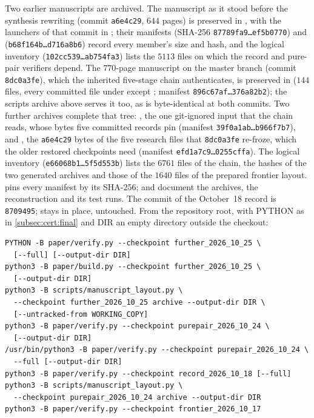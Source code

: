 Two earlier manuscripts are archived. The manuscript as it stood before the synthesis
rewriting (commit \texttt{a6e4c29}, $644$ pages) is preserved in
, with the launchers of that
commit in ; their manifests
 (SHA-256
\texttt{87789fa9\ldots ef5b0770}) and
(\texttt{b68f164b\ldots d716a8b6}) record every member's size and hash, and the
logical inventory 
(\texttt{102cc539\ldots ab754fa3}) lists the $5113$ files on which the record and
pure-pair verifiers depend. The $770$-page manuscript on the master branch (commit
\texttt{8dc0a3fe}), which the inherited five-stage chain authenticates,
is preserved in  ($144$ files,
every committed file under  except ;
manifest \texttt{896c67af\ldots 376a82b2}); the scripts archive above serves it
too, as  is byte-identical at both commits. Two further archives
complete that tree: , the one
git-ignored input that the chain reads, whose bytes five committed records pin
(manifest \texttt{39f0a1ab\ldots b966f7b7}), and
, the \texttt{a6e4c29} bytes
of the five research files that \texttt{8dc0a3fe} re-froze, which the older
restored checkpoints need (manifest \texttt{efd1a7c9\ldots 0255cffa}). The
logical inventory 
(\texttt{e66068b1\ldots 5f5d553b}) lists the $6761$ files of the chain, the
hashes of the two generated archives and those of the $1640$ files of the
prepared frontier layout.  pins every
manifest by its SHA-256;  and
 document the archives, the
reconstruction and its test runs. The commit of the October~18 record is
\texttt{8709495};  stays in place, untouched. From the
repository root, with PYTHON as in \cref{subsec:cert:final} and DIR an empty
directory outside the checkout:
\begin{verbatim}
PYTHON -B paper/verify.py --checkpoint further_2026_10_25 \
  [--full] [--output-dir DIR]
python3 -B paper/build.py --checkpoint further_2026_10_25 \
  [--output-dir DIR]
python3 -B scripts/manuscript_layout.py \
  --checkpoint further_2026_10_25 archive --output-dir DIR \
  [--untracked-from WORKING_COPY]
python3 -B paper/verify.py --checkpoint purepair_2026_10_24 \
  [--output-dir DIR]
/usr/bin/python3 -B paper/verify.py --checkpoint purepair_2026_10_24 \
  --full [--output-dir DIR]
python3 -B paper/verify.py --checkpoint record_2026_10_18 [--full]
python3 -B scripts/manuscript_layout.py \
  --checkpoint purepair_2026_10_24 archive --output-dir DIR
python3 -B paper/verify.py --checkpoint frontier_2026_10_17
\end{verbatim}
